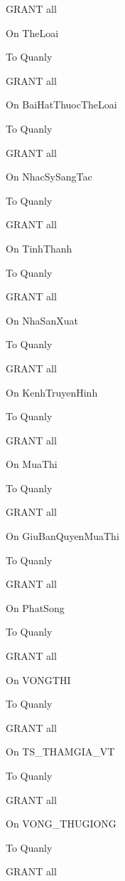 \documentclass{report}
\begin{document}
\bigskip

GRANT all

On TheLoai 

To Quanly

\bigskip

GRANT all

On BaiHatThuocTheLoai 

To Quanly

\bigskip

GRANT all

On NhacSySangTac 

To Quanly

\bigskip

GRANT all

On TinhThanh 

To Quanly

\bigskip

GRANT all

On NhaSanXuat 

To Quanly

\bigskip

GRANT all

On KenhTruyenHinh 

To Quanly

\bigskip

GRANT all

On MuaThi 

To Quanly

\bigskip

GRANT all

On GiuBanQuyenMuaThi 

To Quanly

\bigskip

GRANT all

On PhatSong 

To Quanly

\bigskip


GRANT all

On VONGTHI 

To Quanly

\bigskip

GRANT all

On TS\_THAMGIA\_VT

To Quanly

\bigskip

GRANT all

On VONG\_THUGIONG

To Quanly

\bigskip

GRANT all
\end{document}
